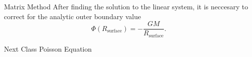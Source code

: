 \documentclass[11pt]{beamer}
\begin{document}
\begin{frame}[fragile]{Matrix Method}
After finding the solution to the linear system, it is neccesary to correct for the analytic outer boundary
value 
\begin{equation}
\Phi(R_\text{surface}) = - \frac{G M}{R_\text{surface}}.
\end{equation}
\end{frame}


\begin{frame}[fragile]{Next Class}
Poisson Equation
\end{frame}
\end{document}
